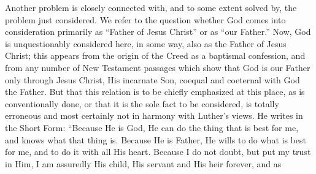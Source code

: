 Another problem is closely connected with, and to some extent solved by, the problem just considered. We refer to the question whether God comes into consideration primarily as “Father of Jesus Christ” or as “our Father.” Now, God is unquestionably considered here, in some way, also as the Father of Jesus Christ; this appears from the origin of the Creed as a baptismal confession, and from any number of New Testament passages which show that God is our Father only through Jesus Christ, His incarnate Son, coequal and coeternal with God the Father. But that this relation is to be chiefly emphasized at this place, as is conventionally done, or that it is the sole fact to be considered, is totally erroneous and most certainly not in harmony with Luther’s views. He writes in the Short Form: “Because He is God, He can do the thing that is best for me, and knows what that thing is. Because He is Father, He wills to do what is best for me, and to do it with all His heart. Because I do not doubt, but put my trust in Him, I am assuredly His child, His servant and His heir forever, and as
